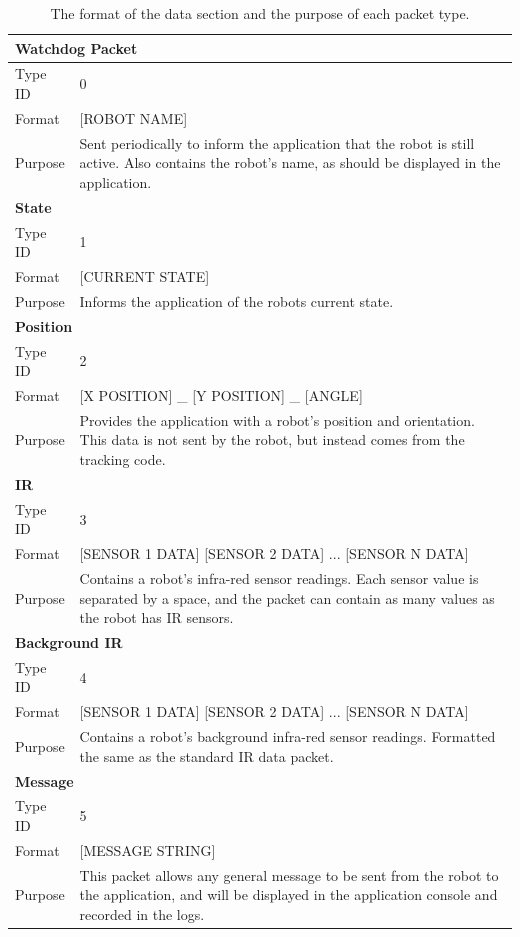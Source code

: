 \begin{longtable}{ l p{12cm} }
\caption[Data Format]{The format of the data section and the purpose of each packet type.}\\
 \hline
 \multicolumn{2}{p{12cm}}{\textbf{Watchdog Packet}}\\
 \hline
 Type ID & 0 \\
 Format & [ROBOT NAME]\\
 Purpose & Sent periodically to inform the application that the robot is still active. Also contains the robot's name, as should be displayed in the application.\\
 
 \hline
 \multicolumn{2}{p{12cm}}{\textbf{State}}\\
 \hline
 Type ID & 1 \\
 Format & [CURRENT STATE]\\
 Purpose & Informs the application of the robots current state.\\
 
 \hline
 \multicolumn{2}{p{12cm}}{\textbf{Position}}\\
 \hline
 Type ID & 2 \\
 Format & [X POSITION] \_ [Y POSITION] \_ [ANGLE]\\
 Purpose & Provides the application with a robot's position and orientation. This data is not sent by the robot, but instead comes from the tracking code.\\
 
 \hline
 \multicolumn{2}{p{12cm}}{\textbf{IR}}\\
 \hline
 Type ID & 3 \\
 Format & [SENSOR 1 DATA] [SENSOR 2 DATA] ... [SENSOR N DATA] \\
 Purpose & Contains a robot's infra-red sensor readings. Each sensor value is separated by a space, and the packet can contain as many values as the robot has IR sensors. \\
 
 \hline
 \multicolumn{2}{p{12cm}}{\textbf{Background IR}}\\
 \hline
 Type ID & 4 \\
 Format & [SENSOR 1 DATA] [SENSOR 2 DATA] ... [SENSOR N DATA]\\
 Purpose & Contains a robot's background infra-red sensor readings. Formatted the same as the standard IR data packet.\\
 
 \hline
 \multicolumn{2}{p{12cm}}{\textbf{Message}}\\
 \hline
 Type ID & 5 \\
 Format & [MESSAGE STRING]\\
 Purpose & This packet allows any general message to be sent from the robot to the application, and will be displayed in the application console and recorded in the logs. \\
 

\end{longtable}
